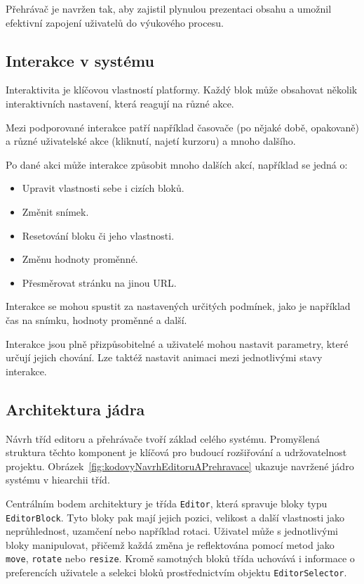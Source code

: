 Přehrávač je navržen tak, aby zajistil plynulou prezentaci obsahu a umožnil efektivní zapojení uživatelů do výukového procesu.

\subsection{Interakce v systému}

Interaktivita je klíčovou vlastností platformy.
Každý blok může obsahovat několik interaktivních nastavení, která reagují na různé akce. 

Mezi podporované interakce patří například časovače (po nějaké době, opakovaně) a různé uživatelské akce (kliknutí, najetí kurzoru) a mnoho dalšího. 

Po dané akci může interakce způsobit mnoho dalších akcí, například se jedná o:

\begin{itemize}
    \item Upravit vlastnosti sebe i cizích bloků.
    \item Změnit snímek.
    \item Resetování bloku či jeho vlastnosti.
    \item Změnu hodnoty proměnné. 
    \item Přesměrovat stránku na jinou URL.
\end{itemize}

Interakce se mohou spustit za nastavených určitých podmínek, jako je například čas na snímku, hodnoty proměnné a další.

Interakce jsou plně přizpůsobitelné a uživatelé mohou nastavit parametry, které určují jejich chování.
Lze taktéž nastavit animaci mezi jednotlivými stavy interakce.

\subsection{Architektura jádra}

Návrh tříd editoru a přehrávače tvoří základ celého systému. 
Promyšlená struktura těchto komponent je klíčová pro budoucí rozšiřování a udržovatelnost projektu.
Obrázek~\ref{fig:kodovyNavrhEditoruAPrehravace} ukazuje navržené jádro systému v hiearchii tříd.

Centrálním bodem architektury je třída \texttt{Editor}, která spravuje bloky typu \texttt{EditorBlock}. 
Tyto bloky pak mají jejich pozici, velikost a další vlastnosti jako neprůhlednost, uzamčení nebo například rotaci. 
Uživatel může s jednotlivými bloky manipulovat, přičemž každá změna je reflektována pomocí metod jako \texttt{move}, \texttt{rotate} nebo \texttt{resize}.
Kromě samotných bloků třída uchovává i informace o preferencích uživatele a selekci bloků prostřednictvím objektu \texttt{EditorSelector}.

